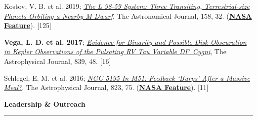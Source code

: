 \documentclass[12pt]{article}
\begin{document}
\begin{etaremune}
\item {Kostov, V. B. et al. 2019}; \href{https://ui.adsabs.harvard.edu/abs/2019AJ....158...32K/abstract}{\it The L 98-59 System: Three Transiting, Terrestrial-size Planets Orbiting a Nearby M Dwarf}, The Astronomical Journal, 158, 32. (\href{https://www.nasa.gov/feature/goddard/2019/nasa-s-tess-mission-finds-its-smallest-planet-yet}{\bf NASA Feature}). [125]

\item {\bf Vega, L. D. et al. 2017}; \href{https://ui.adsabs.harvard.edu/abs/2017ApJ...839...48V/abstract}{\it Evidence for Binarity and Possible Disk Obscuration in Kepler Observations of the Pulsating RV Tau Variable DF~Cygni}, The Astrophysical Journal, 839, 48. [16]

\item {Schlegel, E. M. et al. 2016}; \href{https://ui.adsabs.harvard.edu/abs/2016ApJ...823...75S/abstract}{\it NGC 5195 In M51: Feedback ‘Burps’ After a Massive Meal?}, The Astrophysical Journal, 823, 75. (\href{https://www.nasa.gov/mission_pages/chandra/nasa-s-chandra-finds-supermassive-black-hole-burping-nearby.html}{\bf NASA Feature}). [11]

\end{etaremune}


\newpage
\noindent
{\bf Leadership \& Outreach} \\
\vspace{-10mm}
\begin{center}
\rule{\textwidth}{0.2mm}
\end{center}
\vspace{-3mm}
\end{document}
